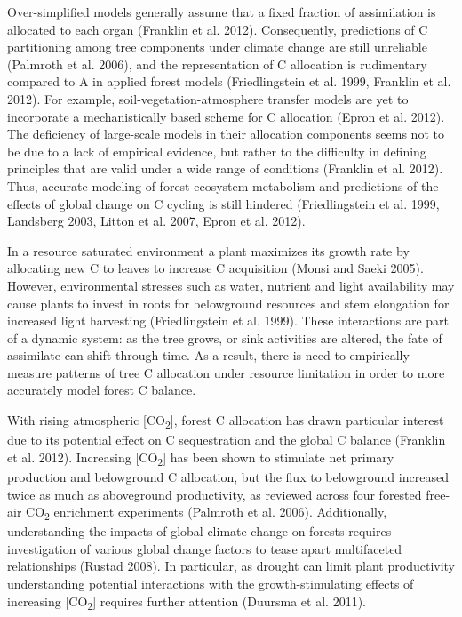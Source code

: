 \documentclass[a4paper]{article}
\begin{document}
Over-simplified models generally assume that a fixed fraction of assimilation is allocated to each organ (Franklin et al. 2012). Consequently, predictions of C partitioning among tree components under climate change are still unreliable (Palmroth et al. 2006), and the representation of C allocation is rudimentary compared to A in applied forest models (Friedlingstein et al. 1999, Franklin et al. 2012). For example, soil-vegetation-atmosphere transfer models are yet to incorporate a mechanistically based scheme for C allocation (Epron et al. 2012). The deficiency of large-scale models in their allocation components seems not to be due to a lack of empirical evidence, but rather to the difficulty in defining principles that are valid under a wide range of conditions (Franklin et al. 2012). Thus, accurate modeling of forest ecosystem metabolism and predictions of the effects of global change on C cycling is still hindered (Friedlingstein et al. 1999, Landsberg 2003, Litton et al. 2007, Epron et al. 2012). 

In a resource saturated environment a plant maximizes its growth rate by allocating new C to leaves to increase C acquisition (Monsi and Saeki 2005). However, environmental stresses such as water, nutrient and light availability may cause plants to invest in roots for belowground resources and stem elongation for increased light harvesting (Friedlingstein et al. 1999). These interactions are part of a dynamic system:  as the tree grows, or sink activities are altered, the fate of assimilate can shift through time. As a result, there is need to empirically measure patterns of tree C allocation under resource limitation in order to more accurately model forest C balance.

With rising atmospheric [CO\textsubscript{2}], forest C allocation has drawn particular interest due to its potential effect on C sequestration and the global C balance (Franklin et al. 2012). Increasing [CO\textsubscript{2}]  has been shown to stimulate net primary production and belowground C allocation, but the flux to belowground increased twice as much as aboveground productivity, as reviewed across four forested free-air CO\textsubscript{2} enrichment experiments (Palmroth et al. 2006). Additionally, understanding the impacts of global climate change on forests requires investigation of various global change factors to tease apart multifaceted relationships (Rustad 2008). In particular, as drought can limit plant productivity understanding potential interactions with the growth-stimulating effects of increasing [CO\textsubscript{2}]  requires further attention (Duursma et al. 2011). 
\end{document}
